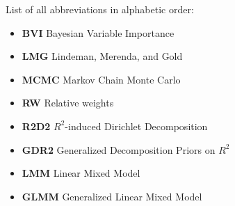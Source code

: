 
List of all abbreviations in alphabetic order:

\begin{itemize}
    \item \textbf{BVI} Bayesian Variable Importance
    \item \textbf{LMG} Lindeman, Merenda, and Gold
    \item \textbf{MCMC} Markov Chain Monte Carlo
    \item \textbf{RW} Relative weights
    \item \textbf{R2D2} $R^2$-induced Dirichlet Decomposition
    \item \textbf{GDR2} Generalized Decomposition Priors on $R^2$
    \item \textbf{LMM} Linear Mixed Model
    \item \textbf{GLMM} Generalized Linear Mixed Model
\end{itemize}
